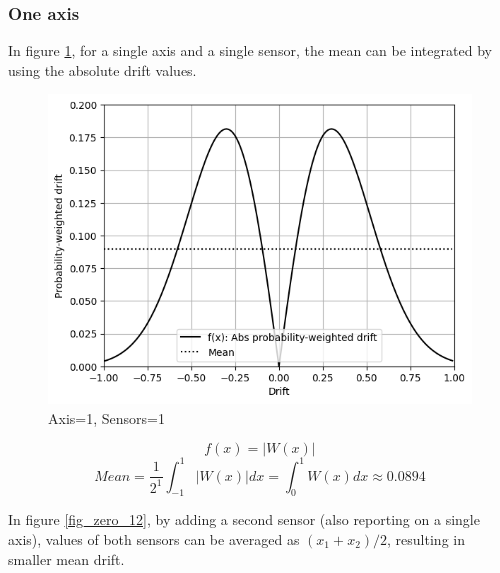\documentclass[10pt, twocolumn, a4paper]{article}
\begin{document}
        \subsubsection{One axis}
            In figure \ref{fig_zero_11}, for a single axis and a single sensor, the mean can be integrated by using the absolute drift values.
            \begin{figure}[H]
                \begin{center}
                    \caption{Axis=1, Sensors=1}
                    \label{fig_zero_11}
                    \includegraphics[width=0.8\linewidth]{multiple_ars/figure_drift_1b.png}
                \end{center}
            \end{figure}
            \vspace{-8mm}
            $$ f(x) = |W(x)| $$
            $$ Mean = \frac{1}{2^1} \int_{-1}^1 |W(x)| dx = \int_0^1 W(x) dx \approx 0.0894 $$

            In figure \ref{fig_zero_12}, by adding a second sensor (also reporting on a single axis), values of both sensors can be averaged as $ (x_1 + x_2)/2 $, resulting in smaller mean drift.
\end{document}
